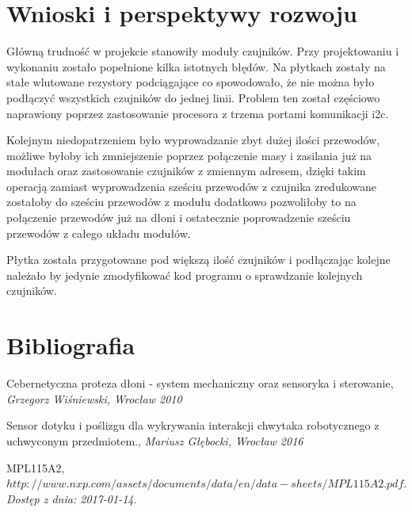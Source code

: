 \documentclass[a4paper,12pt]{article}
\begin{document}
	\section{Wnioski i perspektywy rozwoju}
		Główną trudność w projekcie stanowiły moduły czujników. Przy projektowaniu i wykonaniu zostało popełnione kilka istotnych błędów. Na płytkach zostały na stałe wlutowane rezystory podciągające co spowodowało, że nie można było podłączyć wszystkich czujników do jednej linii. Problem ten został częściowo naprawiony poprzez zastosowanie procesora z trzema portami komunikacji i2c.
		
		 Kolejnym niedopatrzeniem było wyprowadzanie zbyt dużej ilości przewodów, możliwe byłoby ich zmniejszenie poprzez połączenie masy i zasilania już na modułach oraz zastosowanie czujników z zmiennym adresem, dzięki takim operacją zamiast wyprowadzenia sześciu przewodów z czujnika zredukowane zostałoby do sześciu przewodów z modułu dodatkowo pozwoliłoby to na połączenie przewodów już na dłoni i ostatecznie poprowadzenie sześciu przewodów z całego układu modułów.
		
		Płytka została przygotowane pod większą ilość czujników i podłączając kolejne należało by jedynie zmodyfikować kod programu o sprawdzanie kolejnych czujników.
	
	\section{Bibliografia}
\begin{thebibliography}{99}

 Cebernetyczna proteza dłoni - system mechaniczny oraz sensoryka i sterowanie,
\textit {Grzegorz Wiśniewski, Wrocław 2010}

 Sensor dotyku i poślizgu dla wykrywania interakcji chwytaka robotycznego z uchwyconym przedmiotem.,
\textit {Mariusz Głębocki, Wrocław 2016}

 MPL115A2,
\textit {$http://www.nxp.com/assets/documents/data/en/data-sheets/MPL115A2.pdf.$ Dostęp z dnia: 2017-01-14.}






\end{thebibliography}
	
	
\end{document}
